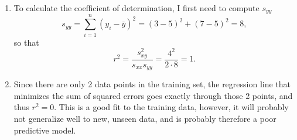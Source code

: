 \begin{problem}{22}
\begin{enumerate}
\item To calculate the coefficient of determination, I first need to compute $s_{yy}$
\begin{equation*}
s_{yy} = \sum_{i=1}^n(y_i-\bar y)^2 = (3-5)^2+(7-5)^2=8,
\end{equation*}
so that
\begin{equation*}
r^2 = \frac{s_{xy}^2}{s_{xx}s_{yy}}  = \frac{4^2}{2\cdot8} =1.
\end{equation*}

\item Since there are only 2 data points in the training set, the regression line that minimizes the sum of squared errors goes exactly through those 2 points, and thus $r^2 = 0$.  This is a good fit to the training data, however, it will probably not generalize well to new, unseen data, and is probably therefore a poor predictive model.

\end{enumerate}

\end{problem}

